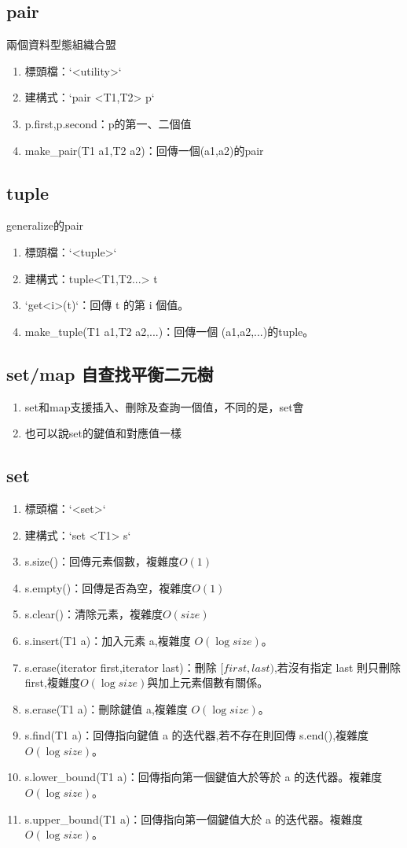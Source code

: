 \subsection{pair} 
兩個資料型態組織合盟
\begin{enumerate}
\item 標頭檔：`<utility>`
\item 建構式：`pair <T1,T2> p`
\item p.first,p.second：p的第一、二個值
\item make\_pair(T1 a1,T2 a2)：回傳一個(a1,a2)的pair
\end{enumerate}
\subsection{tuple} 
generalize的pair
\begin{enumerate}
\item 標頭檔：`<tuple>`
\item 建構式：tuple<T1,T2...> t
\item `get<i>(t)`：回傳 t 的第 i 個值。
\item make\_tuple(T1 a1,T2 a2,...)：回傳一個 (a1,a2,...)的tuple。
\end{enumerate}
\subsection{set/map 自查找平衡二元樹} 
\begin{enumerate}
\item set和map支援插入、刪除及查詢一個值，不同的是，set會 
\item 也可以說set的鍵值和對應值一樣
\end{enumerate} 
\subsection{set} 
\begin{enumerate}
\item 標頭檔：`<set>`
\item 建構式：`set <T1> s`
\item s.size()：回傳元素個數，複雜度$O(1)$
\item s.empty()：回傳是否為空，複雜度$O(1)$
\item s.clear()：清除元素，複雜度$O(size)$
\item s.insert(T1 a)：加入元素 a,複雜度 $O(\log size)$。
\item s.erase(iterator first,iterator last)：刪除 $[first,last)$,若沒有指定 last 則只刪除 first,複雜度$O(\log size)$與加上元素個數有關係。
\item s.erase(T1 a)：刪除鍵值 a,複雜度 $O(\log size)$。
\item s.find(T1 a)：回傳指向鍵值 a 的迭代器,若不存在則回傳 s.end(),複雜度 $O(\log size)$。
\item s.lower\_bound(T1 a)：回傳指向第一個鍵值大於等於 a 的迭代器。複雜度 $O(\log size)$。
\item s.upper\_bound(T1 a)：回傳指向第一個鍵值大於 a 的迭代器。複雜度 $O(\log size)$。
\end{enumerate}

